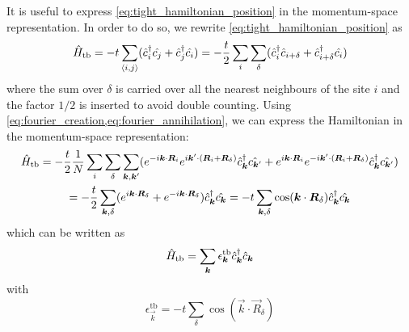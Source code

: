 It is useful to express \cref{eq:tight_hamiltonian_position} in the momentum-space representation. In order to do so, we rewrite \cref{eq:tight_hamiltonian_position} as
\begin{equation}
    \hat{H}_\text{tb} = -t \sum_{\langle i,j \rangle} (\hat{c}^\dagger_i\hat{c_j} +  \hat{c}^\dagger_j\hat{c_i})
    = -\frac{t}{2} \sum_{i} \sum_\delta (\hat{c}^\dagger_i\hat{c}_{i+\delta} +  \hat{c}^\dagger_{i+\delta}\hat{c_i})
\end{equation}
where the sum over $\delta$ is carried over all the nearest neighbours of the site $i$ and the factor $1/2$ is inserted to avoid double counting. Using \cref{eq:fourier_creation,eq:fourier_annihilation}, we can express the Hamiltonian in the momentum-space representation:
\begin{multline}
    \hat{H}_\text{tb}
    = -\frac{t}{2} \frac{1}{N} \sum_{i} \sum_\delta \sum_{\mathbf{\boldsymbol{k}}, \mathbf{\boldsymbol{k}}'}
    (e^{-i\mathbf{\boldsymbol{k}}\cdot\mathbf{\boldsymbol{R}}_i} e^{i\mathbf{\boldsymbol{k}}'\cdot(\mathbf{\boldsymbol{R}}_i+\mathbf{\boldsymbol{R}}_\delta)} \hat{c}^\dagger_{\mathbf{\boldsymbol{k}}} \hat{c_{\mathbf{\boldsymbol{k}}'}} +
    e^{i\mathbf{\boldsymbol{k}}\cdot\mathbf{\boldsymbol{R}}_i} e^{-i\mathbf{\boldsymbol{k}}'\cdot(\mathbf{\boldsymbol{R}}_i+\mathbf{\boldsymbol{R}}_\delta)} \hat{c}^\dagger_{\mathbf{\boldsymbol{k}}} \hat{c_{\mathbf{\boldsymbol{k}}'}}) \\
    = -\frac{t}{2} \sum_{\mathbf{\boldsymbol{k}},\delta} (e^{i\mathbf{\boldsymbol{k}}\cdot\mathbf{\boldsymbol{R}}_\delta}+e^{-i\mathbf{\boldsymbol{k}}\cdot\mathbf{\boldsymbol{R}}_\delta})  \hat{c}^\dagger_{\mathbf{\boldsymbol{k}}} \hat{c_{\mathbf{\boldsymbol{k}}}}
    = -t \sum_{\mathbf{\boldsymbol{k}},\delta} \cos(\mathbf{\boldsymbol{k}}\cdot\mathbf{\boldsymbol{R}}_\delta) \hat{c}^\dagger_{\mathbf{\boldsymbol{k}}} \hat{c_{\mathbf{\boldsymbol{k}}}}
\end{multline}
which can be written as
\begin{equation} \label{eq:tight_hamiltonian_momentum}
    \hat{H}_\text{tb} = \sum_{\mathbf{\boldsymbol{k}}} \epsilon_{\mathbf{\boldsymbol{k}}}^\text{tb} \hat{c}^\dagger_{\mathbf{\boldsymbol{k}}}\hat{c}_{\mathbf{\boldsymbol{k}}}
\end{equation}
with
\begin{equation}
    \epsilon_\vec{k}^\text{tb} = -t \sum_{    \delta} \cos(\vec{k}\cdot\vec{R}_\delta)
\end{equation}

